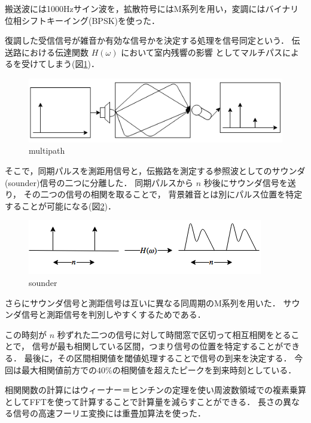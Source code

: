搬送波には1000Hzサイン波を，拡散符号にはM系列を用い，変調にはバイナリ位相シフトキーイング(BPSK)を使った．

復調した受信信号が雑音か有効な信号かを決定する処理を信号同定という．
伝送路における伝達関数 $H(\omega)$ において室内残響の影響
としてマルチパスによるを受けてしまう(図\ref{fig:multipath})．

\begin{figure}[pb]\centering
  \hspace{-2mm}\includegraphics[clip,width=1.1\hsize]{img/multipath.png}
  \caption{multipath}\label{fig:multipath}
\end{figure}


そこで，同期パルスを測距用信号と，伝搬路を測定する参照波としてのサウンダ(sounder)信号の二つに分離した．
同期パルスから $n$ 秒後にサウンダ信号を送り，
その二つの信号の相関を取ることで，
背景雑音とは別にパルス位置を特定することが可能になる(図\ref{fig:sounder})．

\begin{figure}[pb]\centering
  \hspace{-2mm}\includegraphics[clip,width=1.1\hsize]{img/sounder.png}
  \caption{sounder}\label{fig:sounder}
\end{figure}

さらにサウンダ信号と測距信号は互いに異なる同周期のM系列を用いた．
サウンダ信号と測距信号を判別しやすくするためである．

この時刻が $n$ 秒ずれた二つの信号に対して時間窓で区切って相互相関をとることで，
信号が最も相関している区間，つまり信号の位置を特定することができる．
最後に，その区間相関値を閾値処理することで信号の到来を決定する．
今回は最大相関値前方での40\%の相関値を超えたピークを到来時刻としている．

相関関数の計算にはウィーナー＝ヒンチンの定理を使い周波数領域での複素乗算としてFFTを使って計算することで計算量を減らすことができる．
長さの異なる信号の高速フーリエ変換には重畳加算法\cite{overwrap}を使った．


